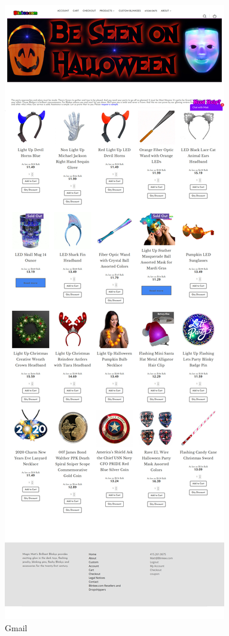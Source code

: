 \documentclass[a4paper,11pt,oneside]{scrreprt}
\begin{document}
\begin{figure}[H]
	\includegraphics[clip, trim=0cm 90cm 0cm 20cm, scale=0.35]{./images/blinkee.jpg}
	\caption{Gmail}
	\label{fig:sub2}
\end{figure}
\end{document}
